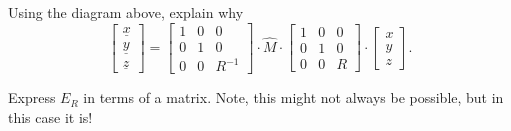 \documentclass[newpage,hints,handout,noauthor,nooutcomes,12pt]{ximera}
\begin{document}
\begin{problem}
Using the diagram above, explain why%
\[
\begin{bmatrix} \underline{x} \\ \underline{y} \\ \underline{z} \end{bmatrix}
=\begin{bmatrix}
1 & 0 & 0\\
0 & 1 & 0\\
0 & 0 & R^{-1}
\end{bmatrix}
  \cdot\hat{M}\cdot\begin{bmatrix}
%
1 & 0 & 0\\
0 & 1 & 0\\
0 & 0 & R
\end{bmatrix}
\cdot \begin{bmatrix}x \\ y \\ z\end{bmatrix}.
\]
\begin{hint}
  Express $E_R$ in terms of a matrix. Note, this might not always be
  possible, but in this case it is!
\end{hint}


\end{problem}
\end{document}
